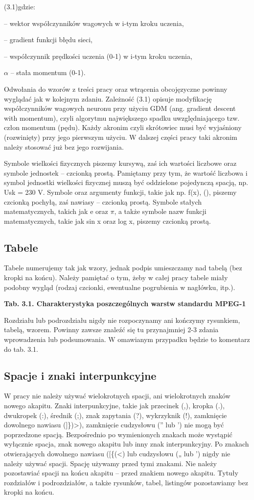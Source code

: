 (3.1)gdzie:

– wektor współczynników wagowych w i-tym kroku uczenia,

– gradient funkcji błędu sieci,

– współczynnik prędkości uczenia (0-1) w i-tym kroku uczenia,

$\alpha$ – stała momentum (0-1).

Odwołania do wzorów z treści pracy oraz wtrącenia obcojęzyczne powinny wyglądać jak w kolejnym zdaniu. Zależność (3.1) opisuje modyfikację współczynników wagowych neuronu przy użyciu GDM (ang. gradient descent with momentum), czyli algorytmu największego spadku uwzględniającego tzw. człon momentum (pędu). Każdy akronim czyli skrótowiec musi być wyjaśniony (rozwinięty) przy jego pierwszym użyciu. W dalszej części pracy taki akronim należy stosować już bez jego rozwijania.

Symbole wielkości fizycznych piszemy kursywą, zaś ich wartości liczbowe oraz symbole jednostek – czcionką prostą. Pamiętamy przy tym, że wartość liczbowa i symbol jednostki wielkości fizycznej muszą być oddzielone pojedynczą spacją, np. Usk = 230 V. Symbole oraz argumenty funkcji, takie jak np. f(x), (), piszemy czcionką pochyłą, zaś nawiasy – czcionką prostą. Symbole stałych matematycznych, takich jak e oraz $\pi$, a także symbole nazw funkcji matematycznych, takie jak sin x oraz log x, piszemy czcionką prostą.

\subsection{Tabele}

Tabele numerujemy tak jak wzory, jednak podpis umieszczamy nad tabelą (bez kropki na końcu). Należy pamiętać o tym, żeby w całej pracy tabele miały podobny wygląd (rodzaj czcionki, ewentualne pogrubienia w nagłówku, itp.).

\textbf{Tab. 3.1. Charakterystyka poszczególnych warstw standardu MPEG-1}

Rozdziału lub podrozdziału nigdy nie rozpoczynamy ani kończymy rysunkiem, tabelą, wzorem. Powinny zawsze znaleźć się tu przynajmniej 2-3 zdania wprowadzenia lub podsumowania. W omawianym przypadku będzie to komentarz do tab. 3.1.

\subsection{Spacje i znaki interpunkcyjne}

W pracy nie należy używać wielokrotnych spacji, ani wielokrotnych znaków nowego akapitu. Znaki interpunkcyjne, takie jak przecinek (,), kropka (.), dwukropek (:), średnik (;), znak zapytania (?), wykrzyknik (!), zamknięcie dowolnego nawiasu (]\})>), zamknięcie cudzysłowu (” lub ’) nie mogą być poprzedzone spacją. Bezpośrednio po wymienionych znakach może wystąpić wyłącznie spacja, znak nowego akapitu lub inny znak interpunkcyjny. Po znakach otwierających dowolnego nawiasu ([\{(<) lub cudzysłowu („ lub ') nigdy nie należy używać spacji. Spację używamy przed tymi znakami. Nie należy pozostawiać spacji na końcu akapitu – przed znakiem nowego akapitu. Tytuły rozdziałów i podrozdziałów, a także rysunków, tabel, listingów pozostawiamy bez kropki na końcu.

